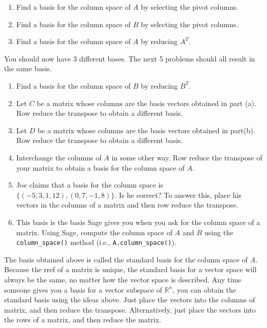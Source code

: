 \begin{enumerate}
\begin{enumerate}
	\item \label{project2A} Find a basis for the column space of $A$ by selecting the pivot columns.
	\item \label{project2B} Find a basis for the column space of $B$ by selecting the pivot columns.
	\item Find a basis for the column space of $A$ by reducing $A^T$. 
	\end{enumerate}
	
	You should now have 3 different bases. The next 5 problems should all result in the same basis.
	\begin{enumerate}[resume]
	\item Find a basis for the column space of $B$ by reducing $B^T$.
	\item Let $C$ be a matrix whose columns are the basis vectors obtained in part (a). Row reduce the transpose to obtain a different basis. 
	\item Let $D$ be a matrix whose columns are the basis vectors obtained in part(b). Row reduce the transpose to obtain a different basis.
	\item Interchange the columns of $A$ in some other way.  Row reduce the transpose of your matrix to obtain a basis for the column space of $A$.
	\item Joe claims that a basis for the column space is 
	$\{(-5,3,1,12),(0,7,-1,8)\}$.  Is he correct?  To answer this, place his vectors in the columns of a matrix and then row reduce the transpose.  

      \item This basis is the basis Sage gives you when you ask for the column
space of a matrix.  Using Sage, compute the column space of $A$ and
$B$ using the \verb|column_space()| method (i.e., \verb|A.column_space()|).

\end{enumerate}

The basis obtained above is called the standard basis for the column
space of $A$. Because the rref of a matrix is unique, the standard
basis for a vector space will always be the same, no matter how the
vector space is described.  Any time someone gives you a basis for a vector subspace of $\mathbb{R}^n$, you can obtain the standard basis using the ideas above.  Just place the  vectors into the columns of matrix, and then reduce the transpose. Alternatively, just place the vectors into the rows of a matrix, and then reduce the matrix. 



 



\end{enumerate}



